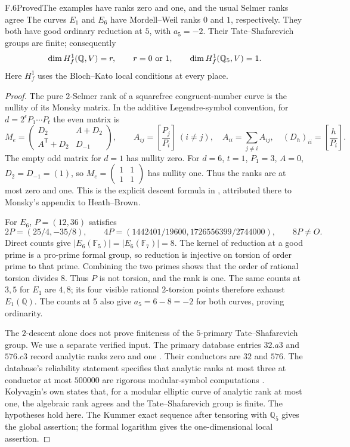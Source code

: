 \begin{statement}{F.6}{Proved}{The examples have ranks zero and one, and the usual Selmer ranks agree}
The curves $E_1$ and $E_6$ have Mordell--Weil ranks $0$ and $1$, respectively.
They both have good ordinary reduction at $5$, with $a_5=-2$.
Their Tate--Shafarevich groups are finite; consequently
\[
 \dim H_f^1(\mathbb Q,V)=r,\qquad r=0\ \hbox{or}\ 1,
 \qquad \dim H_f^1(\mathbb Q_5,V)=1.
\]
Here $H_f^1$ uses the Bloch--Kato local conditions at every place.
\end{statement}
\begin{proof}
The pure $2$-Selmer rank of a squarefree congruent-number curve is the
nullity of its Monsky matrix. In the additive Legendre-symbol convention,
for $d=2^\epsilon P_1\cdots P_t$ the even matrix is
\[
 M_e=\begin{pmatrix}D_2&A+D_2\\ A^{\mathsf T}+D_2&D_{-1}\end{pmatrix},
 \qquad
 A_{ij}=\left[\frac{P_j}{P_i}\right]\ (i\ne j),\quad
 A_{ii}=\sum_{j\ne i}A_{ij},
 \quad (D_h)_{ii}=\left[\frac h{P_i}\right].
\]
The empty odd matrix for $d=1$ has nullity zero. For $d=6$, $t=1$,
$P_1=3$, $A=0$, $D_2=D_{-1}=(1)$, so
$M_e=\left(\begin{smallmatrix}1&1\\1&1\end{smallmatrix}\right)$ has
nullity one. Thus the ranks are at most zero and one. This is the
explicit descent formula in \citet[\S2, (2.1)--(2.3)]{FE_DasSaikia2024},
attributed there to Monsky's appendix to Heath--Brown.

For $E_6$, $P=(12,36)$ satisfies
\[
 2P=(25/4,-35/8),\qquad
 4P=(1442401/19600,1726556399/2744000),\qquad 8P\ne O.
\]
Direct counts give $|E_6(\mathbb F_5)|=|E_6(\mathbb F_7)|=8$.
The kernel of reduction at a good prime is a pro-prime formal group, so
reduction is injective on torsion of order prime to that prime. Combining
the two primes shows that the order of rational torsion divides $8$.
Thus $P$ is not torsion, and the rank is one. The same counts at $3,5$
for $E_1$ are $4,8$; its four visible rational $2$-torsion points therefore
exhaust $E_1(\mathbb Q)$. The counts at $5$ also give $a_5=6-8=-2$ for
both curves, proving ordinarity.

The $2$-descent alone does not prove finiteness of the $5$-primary
Tate--Shafarevich group. We use a separate verified input. The primary
database entries $32.a3$ and $576.c3$ record analytic ranks zero and one
\citep{FE_LMFDBE1,FE_LMFDBE6}. Their conductors are $32$ and $576$.
The database's reliability statement specifies that analytic ranks at
most three at conductor at most $500000$ are rigorous modular-symbol
computations \citep{FE_LMFDBReliability}. Kolyvagin's own
\citet[Theorem 1, printed p.~4; also Example 1, p.~11]{FE_Kolyvagin1990}
states that, for a modular elliptic curve of analytic rank at most one,
the algebraic rank agrees and the Tate--Shafarevich group is finite.
The hypotheses hold here. The Kummer exact sequence after tensoring
with $\mathbb Q_5$ gives the global assertion; the formal logarithm gives
the one-dimensional local assertion.


\end{proof}

